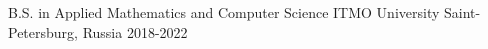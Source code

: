 

\begin{cventries}

  \cventry
    {B.S. in Applied Mathematics and Computer Science} %
    {ITMO University} %
    {Saint-Petersburg, Russia} %
    {2018-2022} %
    {
    }
\vspace{-0.7cm}
\end{cventries}
